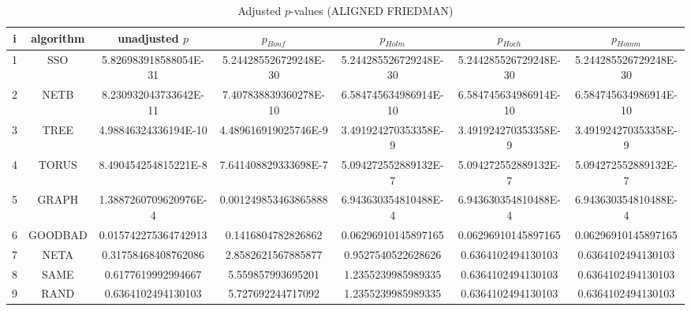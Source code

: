 \documentclass[a4paper,10pt]{article}
\begin{document}
\begin{landscape}
\begin{table}[!htp]
\centering\scriptsize
\caption{Adjusted $p$-values (ALIGNED FRIEDMAN)}
\begin{tabular}{ccccccc}
i&algorithm&unadjusted $p$&$p_{Bonf}$&$p_{Holm}$&$p_{Hoch}$&$p_{Homm}$\\
\hline
1& SSO&5.826983918588054E-31&5.244285526729248E-30&5.244285526729248E-30&5.244285526729248E-30&5.244285526729248E-30\\
2& NETB&8.230932043733642E-11&7.407838839360278E-10&6.584745634986914E-10&6.584745634986914E-10&6.584745634986914E-10\\
3& TREE&4.98846324336194E-10&4.489616919025746E-9&3.491924270353358E-9&3.491924270353358E-9&3.491924270353358E-9\\
4& TORUS&8.490454254815221E-8&7.641408829333698E-7&5.094272552889132E-7&5.094272552889132E-7&5.094272552889132E-7\\
5& GRAPH&1.3887260709620976E-4&0.001249853463865888&6.943630354810488E-4&6.943630354810488E-4&6.943630354810488E-4\\
6& GOODBAD&0.015742275364742913&0.1416804782826862&0.06296910145897165&0.06296910145897165&0.06296910145897165\\
7& NETA&0.31758468408762086&2.8582621567885877&0.9527540522628626&0.6364102494130103&0.6364102494130103\\
8& SAME&0.6177619992994667&5.559857993695201&1.2355239985989335&0.6364102494130103&0.6364102494130103\\
9& RAND&0.6364102494130103&5.727692244717092&1.2355239985989335&0.6364102494130103&0.6364102494130103\\
\hline
\end{tabular}
\end{table}


\end{landscape}
\end{document}
